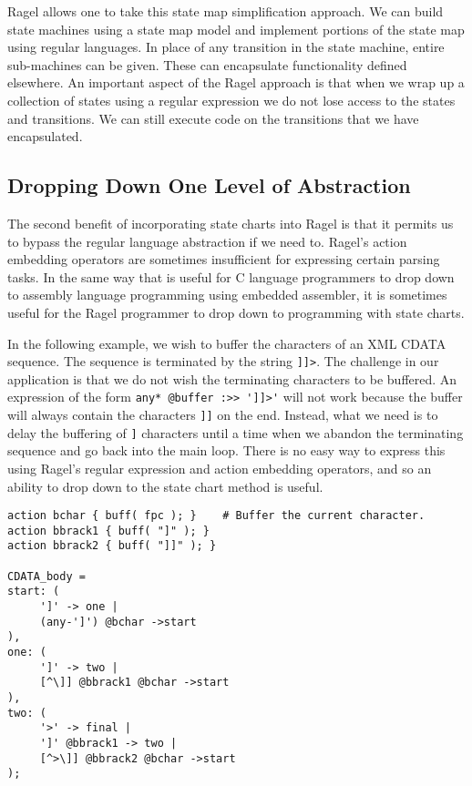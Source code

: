 \documentclass[letterpaper,11pt,oneside]{book}
\newcommand{\verbspace}{\vspace{10pt}}
\newenvironment{inline_code}{\def\baselinestretch{1}\vspace{12pt}\small}{}
\begin{document}
Ragel allows one to take this state map simplification approach. We can build
state machines using a state map model and implement portions of the state map
using regular languages. In place of any transition in the state machine,
entire sub-machines can be given. These can encapsulate functionality
defined elsewhere. An important aspect of the Ragel approach is that when we
wrap up a collection of states using a regular expression we do not lose
access to the states and transitions. We can still execute code on the
transitions that we have encapsulated.

\subsection{Dropping Down One Level of Abstraction}
\label{down}

The second benefit of incorporating state charts into Ragel is that it permits
us to bypass the regular language abstraction if we need to. Ragel's action
embedding operators are sometimes insufficient for expressing certain parsing
tasks.  In the same way that is useful for C language programmers to drop down
to assembly language programming using embedded assembler, it is sometimes
useful for the Ragel programmer to drop down to programming with state charts.

In the following example, we wish to buffer the characters of an XML CDATA
sequence. The sequence is terminated by the string \verb|]]>|. The challenge
in our application is that we do not wish the terminating characters to be
buffered. An expression of the form \verb|any* @buffer :>> ']]>'| will not work
because the buffer will always contain the characters \verb|]]| on the end.
Instead, what we need is to delay the buffering of \verb|]|
characters until a time when we
abandon the terminating sequence and go back into the main loop. There is no
easy way to express this using Ragel's regular expression and action embedding
operators, and so an ability to drop down to the state chart method is useful.

\begin{inline_code}
\begin{verbatim}
action bchar { buff( fpc ); }    # Buffer the current character.
action bbrack1 { buff( "]" ); }
action bbrack2 { buff( "]]" ); }

CDATA_body =
start: (
     ']' -> one |
     (any-']') @bchar ->start
),
one: (
     ']' -> two |
     [^\]] @bbrack1 @bchar ->start
),
two: (
     '>' -> final |
     ']' @bbrack1 -> two |
     [^>\]] @bbrack2 @bchar ->start
);
\end{verbatim}
\end{inline_code}
\verbspace
\end{document}
